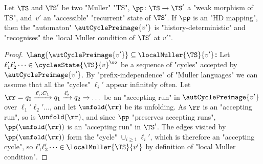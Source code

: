 \documentclass[10pt,a4paper]{amsart}
\newcommand{\re}[1]{\xrightarrow{#1}}
\begin{document}
\begin{lemma}\label{lemma-acd:automaton-precycles}
	Let $\TS$ and $\TS'$ be two "Muller" "TS", $\pp \colon \TS \to \TS'$ a "weak morphism of TS", and~$v'$ an "accessible" "recurrent" state of $\TS'$.
	If $\pp$ is an "HD mapping", then the "automaton"  $\autCyclePreimage{v'}$ is "history-deterministic" and "recognises" the "local Muller condition of $\TS'$ at $v'$".
\end{lemma}
\begin{proof}
	\textbf{$\Lang{\autCyclePreimage{v'}} \subseteq \localMuller{\TS}{v'}$:} Let $\ell_1'\ell_2'\dots\in \cyclesState{\TS}{v}^\oo$ be a sequence of "cycles" accepted by $\autCyclePreimage{v'}$. By "prefix-independence" of "Muller languages" we can assume that all the "cycles" $\ell_i'$ appear infinitely often.
	 Let $\rr = q_0\re{\ell_1':C_1}q_1\re{\ell_2'}q_2\re{} \dots$ be an "accepting run" in $\autCyclePreimage{v'}$ over $\ell_1'\ell_2'\dots$, and let $\unfold(\rr)$ be its unfolding. As $\rr$ is an "accepting run", so is $\unfold(\rr)$, and since $\pp$ "preserves accepting runs", $\pp(\unfold(\rr))$ is an "accepting run" in $\TS'$. The edges visited by $\pp(\unfold(\rr))$ form the "cycle" $\cup_{i\geq 1} \ell_i'$, which is therefore an "accepting cycle", so $\ell_1'\ell_2'\dots\in \localMuller{\TS}{v'}$ by definition of "local Muller condition".
	

\end{proof}
\end{document}
